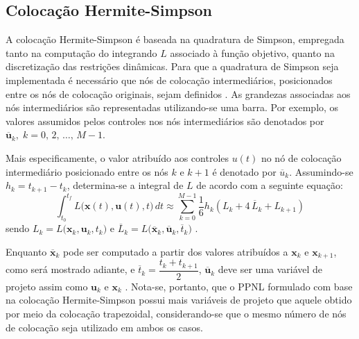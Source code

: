 \subsection{Colocação Hermite-Simpson}
\label{sec:revisao:hersim}


A colocação Hermite-Simpson é baseada na quadratura de Simpson, empregada tanto na computação do integrando $ L$ associado à função objetivo, quanto na discretização das restrições dinâmicas. Para que a quadratura de Simpson seja implementada é necessário que nós de colocação intermediários, posicionados entre os nós de colocação originais, sejam definidos \cite{kelly_introduction_2017}. As grandezas associadas aos nós intermediários são representadas utilizando-se uma barra. Por exemplo, os valores assumidos pelos controles nos nós intermediários são denotados por $ \mathbf{\overline{u}}_k, \; k = 0, \, 2, \, \dots, \, M-1 $. 

Mais especificamente, o valor atribuído aos controles $ u(t) $ no nó de colocação intermediário posicionado entre os nós $ k $ e $ k+1 $ é denotado por $ \overline{u}_k $. Assumindo-se $ h_k = t_{k+1} - t_k $, determina-se a integral de $L$ de acordo com a seguinte equação:
%
\begin{equation}
\label{eq:revisao:hersim:integral}
\int_{t_0}^{t_f} L \big( \mathbf{x}(t), \mathbf{u}(t), t \big) \, dt \approx \sum_{k=0}^{M-1} \frac{1}{6} h_k (L_k + 4 \, \overline{L}_{k} + L_{k+1})
\end{equation}
%
sendo $ L_k =  L \big( \mathbf{x}_k, \mathbf{u}_k, t_k \big) $ e $ \overline{L}_{k} =  L \big( \mathbf{\overline{x}}_{k}, \mathbf{\overline{u}}_{k}, \overline{t}_{k} \big)$ \cite{kelly_introduction_2017}. 

Enquanto $ \mathbf{\overline{x}}_{k} $ pode ser computado a partir dos valores atribuídos a $ \mathbf{x}_{k} $ e $ \mathbf{x}_{k+1} $, como será mostrado adiante, e $ \overline{t}_{k} = \dfrac{t_{k} + t_{k+1}}{2} $, $ \mathbf{\overline{u}}_{k} $ deve ser uma variável de projeto assim como $ \mathbf{u}_{k} $ e $ \mathbf{x}_{k} $ \cite{kelly_introduction_2017}. Nota-se, portanto, que o PPNL formulado com base na colocação Hermite-Simpson possui mais variáveis de projeto que aquele obtido por meio da colocação trapezoidal, considerando-se que o mesmo número de nós de colocação seja utilizado em ambos os casos. 

